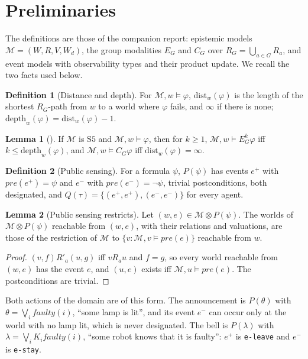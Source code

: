 \documentclass[11pt,a4paper]{article}
\theoremstyle{definition}
\newtheorem{definition}{Definition}
\newtheorem{lemma}{Lemma}
\newcommand{\Mod}{\mathcal{M}}
\newcommand{\prd}{\otimes}
\newcommand{\Kop}[1]{K_{#1}}
\newcommand{\Eop}[1]{E_{#1}}
\newcommand{\Cop}[1]{C_{#1}}
\newcommand{\code}[1]{\texttt{\small #1}}
\newcommand{\pre}{\mathit{pre}}
\newcommand{\dist}{\mathrm{dist}}
\newcommand{\depth}{\mathrm{depth}}
\newcommand{\faulty}{\mathit{faulty}}
\newcommand{\some}{\theta}
\begin{document}
\section{Preliminaries}
\label{sec:prelim}

The definitions are those of the companion report: epistemic models
$\Mod = (W, R, V, W_d)$, the group modalities $\Eop{G}$ and $\Cop{G}$ over
$R_G = \bigcup_{a \in G} R_a$, and event models with observability types and
their product update. We recall the two facts used below.

\begin{definition}[Distance and depth]
For $\Mod, w \models \varphi$, $\dist_w(\varphi)$ is the length of the shortest
$R_G$-path from $w$ to a world where $\varphi$ fails, and $\infty$ if there is
none; $\depth_w(\varphi) = \dist_w(\varphi) - 1$.
\end{definition}

\begin{lemma}[\cite{ulises2026ca}]
\label{lem:depth}
If $\Mod$ is $\mathrm{S5}$ and $\Mod, w \models \varphi$, then for $k \geq 1$,
$\Mod, w \models \Eop{G}^k\varphi$ iff $k \leq \depth_w(\varphi)$, and
$\Mod, w \models \Cop{G}\varphi$ iff $\dist_w(\varphi) = \infty$.
\end{lemma}

\begin{definition}[Public sensing]
For a formula $\psi$, $P(\psi)$ has events $e^+$ with $\pre(e^+) = \psi$ and
$e^-$ with $\pre(e^-) = \neg\psi$, trivial postconditions, both designated, and
$Q(\tau) = \{(e^+,e^+), (e^-,e^-)\}$ for every agent.
\end{definition}

\begin{lemma}[Public sensing restricts]
\label{lem:restrict}
Let $(w,e) \in \Mod \prd P(\psi)$. The worlds of $\Mod \prd P(\psi)$ reachable
from $(w,e)$, with their relations and valuations, are those of the
restriction of $\Mod$ to $\{v : \Mod, v \models \pre(e)\}$ reachable from $w$.
\end{lemma}

\begin{proof}
$(v,f) \mathrel{R'_a} (u,g)$ iff $v R_a u$ and $f = g$, so every world reachable
from $(w,e)$ has the event $e$, and $(u,e)$ exists iff $\Mod, u \models
\pre(e)$. The postconditions are trivial.
\end{proof}

\noindent
Both actions of the domain are of this form. The announcement is $P(\some)$
with $\some = \bigvee_i \faulty(i)$, ``some lamp is lit'', and its event $e^-$
can occur only at the world with no lamp lit, which is never designated. The
bell is $P(\lambda)$ with $\lambda = \bigvee_i \Kop{i}\faulty(i)$, ``some robot
knows that it is faulty'': $e^+$ is \code{e-leave} and $e^-$ is \code{e-stay}.
\end{document}

